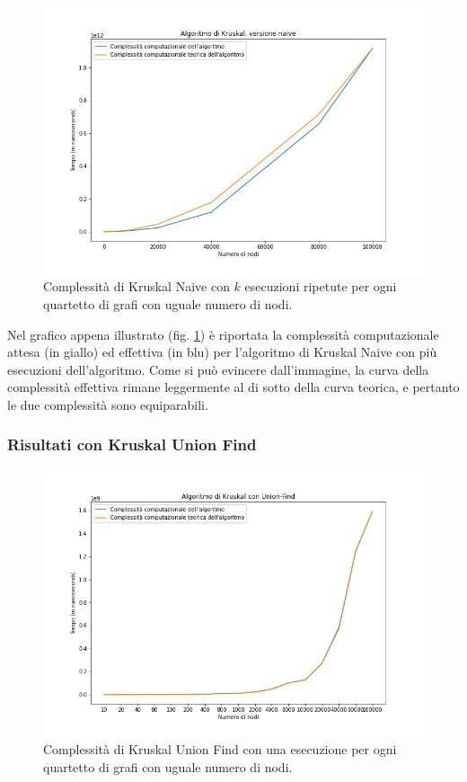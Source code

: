 \begin{figure}[H]
	\centering
	\includegraphics[width=1\textwidth]{res/images/graph-complexity/kruskal_naive.png}
    \caption{Complessità di Kruskal Naive con \(k\) esecuzioni ripetute per ogni quartetto di grafi con uguale numero di nodi.}
	\label{fig:kruskal}
\end{figure}

Nel grafico appena illustrato (fig. \ref{fig:kruskal}) è riportata la complessità computazionale attesa (in giallo) ed effettiva (in blu) per l'algoritmo di Kruskal Naive con più esecuzioni dell'algoritmo. 
Come si può evincere dall'immagine, la curva della complessità effettiva rimane leggermente al di sotto della curva teorica, e pertanto le due complessità sono equiparabili. %


\subsubsection{Risultati con Kruskal Union Find}

\begin{figure}[H]
	\centering
	\includegraphics[width=1\textwidth]{res/images/graph-no-rep/kruskal_uf_senza_ripetizioni.png}
    \caption{Complessità di Kruskal Union Find con una esecuzione per ogni quartetto di grafi con uguale numero di nodi.}
	\label{fig:kruskal_ufnr}
\end{figure}

